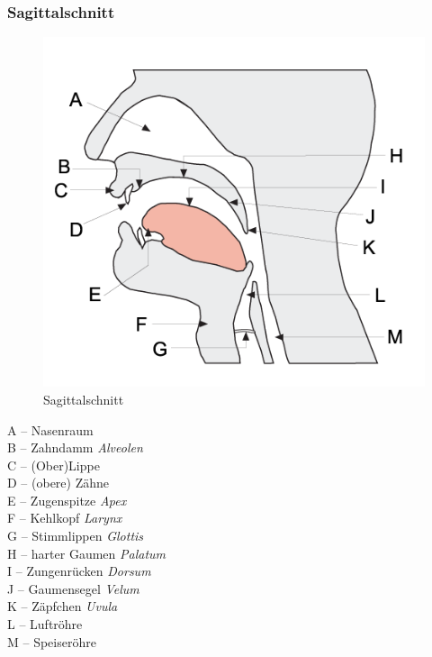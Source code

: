 \begin{frame}
\frametitle{Sagittalschnitt}

\begin{minipage}{0.48\textwidth}
	\begin{figure}
	\centering
	\includegraphics[scale=0.32]{material/04phonoatonomy}
	\caption{Sagittalschnitt}
	\end{figure}
\end{minipage}\hfill
\begin{minipage}{0.4\textwidth}
	A -- Nasenraum\\
	B -- Zahndamm \emph{Alveolen}\\
	C -- (Ober)Lippe \\
	D -- (obere) Zähne\\
	E -- Zugenspitze \emph{Apex}\\
	F -- Kehlkopf \emph{Larynx}\\
	G -- Stimmlippen \emph{Glottis}\\
	H -- harter Gaumen \emph{Palatum}\\
	I -- Zungenrücken \emph{Dorsum}\\
	J -- Gaumensegel \emph{Velum}\\
	K -- Zäpfchen \emph{Uvula}\\
	L -- Luftröhre\\ 
	M -- Speiseröhre
\end{minipage}
	
%		
	
\end{frame}




